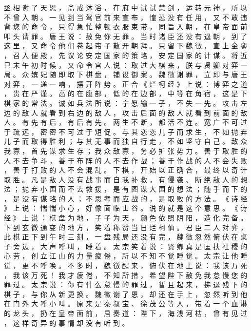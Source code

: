 {丞 相 谢 了 天 恩 ， 斋 戒 沐 浴 ， 在 府 中 试 试 慧 剑 ， 运 转 元 神 ， 所 以 不 曾 入 朝 。
一 见 到 当 驾 官 前 来 宣 布 ， 惶 恐 没 有 任 用 ， 又 不 敢 违 背 您 的 命 令 ， 只 得 急 忙 整 顿 衣 服 束 带 ， 同 旨 入 朝 ， 在 皇 帝 面 前 叩 头 请 罪 。
唐 王 说 ： 赦 免 你 无 罪 。
当 时 诸 臣 还 没 有 退 朝 ， 到 了 这 里 ， 又 命 令 他 们 卷 起 帘 子 散 开 朝 拜 。
只 留 下 魏 徵 ， 宣 上 金 銮 ， 召 入 便 殿 ， 先 议 论 安 定 国 家 的 策 略 ， 安 定 国 家 的 计 谋 。
将 近 巳 末 午 初 时 候 ， 又 命 令 宫 人 说 ： 取 过 大 棋 来 ， 朕 与 贤 卿 对 弈 一 局 。
众 嫔 妃 随 即 取 下 棋 盘 ， 铺 设 御 案 。
魏 徵 谢 罪 ， 立 即 与 唐 王 对 弈 ， 一 递 一 响 ， 摆 开 阵 势 。
正 合 《 烂 柯 经 》 上 说 ： 博 弈 之 道 ， 贵 在 严 谨 。
高 的 在 腹 部 ， 低 的 在 边 部 ， 中 等 在 角 宿 ， 这 是 下 棋 家 的 常 法 。
诚 如 兵 法 所 说 ： 宁 愿 输 一 子 ， 不 失 一 先 。
攻 击 左 边 的 敌 人 就 看 到 右 边 的 敌 人 ， 攻 击 后 面 的 敌 人 就 看 到 前 面 的 敌 人 。
有 先 有 后 ， 有 后 有 先 。
两 生 不 断 ， 都 活 不 连 。
宽 广 不 可 过 于 疏 远 ， 密 密 不 可 过 于 短 促 。
与 其 恋 恋 儿 子 而 求 生 ， 不 如 抛 弃 儿 子 而 取 得 胜 利 ； 与 其 无 事 而 独 自 行 走 ， 不 如 坚 守 自 己 。
敌 众 我 寡 ， 首 先 谋 求 生 存 ； 我 众 敌 寡 ， 务 必 扩 张 势 力 。
善 于 取 胜 的 人 不 去 争 斗 ， 善 于 布 阵 的 人 不 去 作 战 ； 善 于 作 战 的 人 不 会 失 败 ， 善 于 打 败 的 人 不 会 混 乱 。
下 棋 ， 开 始 以 正 确 合 ， 最 终 以 奇 计 取 胜 。
凡 是 敌 人 没 有 战 事 而 自 我 补 救 ， 有 侵 袭 、 断 绝 敌 人 的 想 法 ； 抛 弃 小 国 而 不 去 救 援 ， 是 有 图 谋 大 国 的 想 法 ； 随 手 而 下 的 ， 是 没 有 谋 略 的 人 ； 不 思 考 而 应 战 的 ， 是 取 败 的 方 法 。
《 诗 经 》 上 说 ： 惴 惴 小 心 ， 好 像 面 临 山 谷 。
说 的 就 是 这 个 意 思 。
《 诗 经 》 上 说 ： 棋 盘 为 地 ， 子 子 为 天 ， 颜 色 依 照 阴 阳 ， 造 化 完 备 。
下 到 玄 微 通 变 的 地 方 ， 笑 着 称 赞 当 日 烂 柯 仙 。
君 臣 二 人 对 弈 ， 此 棋 正 下 到 午 时 三 刻 ， 一 盘 残 局 还 没 有 完 ， 魏 徵 忽 然 俯 伏 在 桌 子 旁 边 ， 大 声 呼 叫 ， 睡 着 。
太 宗 笑 着 说 ： 贤 卿 真 是 匡 扶 社 稷 的 心 劳 ， 创 立 江 山 的 力 量 疲 倦 ， 所 以 不 知 不 觉 睡 觉 。
太 宗 让 他 睡 觉 ， 更 不 呼 唤 。
不 多 时 ， 魏 徵 醒 来 ， 俯 伏 在 地 上 说 ： 我 该 万 死 ， 我 该 万 死 ！ 我 才 疲 倦 ， 不 知 所 措 ， 希 望 陛 下 赦 免 我 怠 慢 您 的 罪 过 。
太 宗 说 ： 你 有 什 么 怠 慢 的 罪 过 ， 暂 且 起 来 ， 拂 退 残 下 的 棋 子 ， 与 你 从 新 更 换 。
魏 徵 谢 了 恩 ， 却 还 在 手 上 ， 忽 然 听 到 他 在 门 外 大 呼 小 叫 。
原 来 是 秦 叔 宝 、 徐 茂 公 等 人 ， 带 着 一 个 血 淋 的 龙 头 ， 扔 在 皇 帝 面 前 ， 启 奏 道 ： 陛 下 ， 海 浅 河 枯 ， 曾 有 见 过 ， 这 样 奇 异 的 事 情 却 没 有 听 到 。
}
